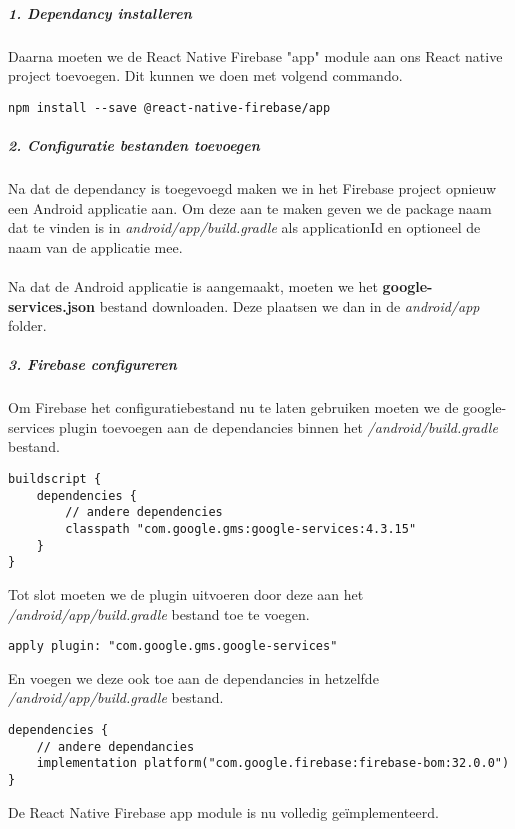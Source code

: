 \subparagraph{1. Dependancy installeren}
Daarna moeten we de React Native Firebase "app" module aan ons React native project toevoegen. 
Dit kunnen we doen met volgend commando.
\begin{verbatim}
npm install --save @react-native-firebase/app
\end{verbatim}

\subparagraph{2. Configuratie bestanden toevoegen}
Na dat de dependancy is toegevoegd maken we in het Firebase project opnieuw een Android applicatie aan. 
Om deze aan te maken geven we de package naam dat te vinden is in \textit{android/app/build.gradle} als 
applicationId en optioneel de naam van de applicatie mee.
\\\\
Na dat de Android applicatie is aangemaakt, moeten we het \textbf{google-services.json} bestand downloaden. 
Deze plaatsen we dan in de \textit{android/app} folder.

\subparagraph{3. Firebase configureren}
Om Firebase het configuratiebestand nu te laten gebruiken moeten we de google-services plugin toevoegen aan 
de dependancies binnen het \textit{/android/build.gradle} bestand. 
\begin{verbatim}
buildscript {
    dependencies {
        // andere dependencies
        classpath "com.google.gms:google-services:4.3.15"
    }
}
\end{verbatim}
Tot slot moeten we de plugin uitvoeren door deze aan het \textit{/android/app/build.gradle} bestand toe te voegen.
\begin{verbatim}
apply plugin: "com.google.gms.google-services"
\end{verbatim}
En voegen we deze ook toe aan de dependancies in hetzelfde \textit{/android/app/build.gradle} bestand.
\begin{verbatim}
dependencies {
    // andere dependancies
    implementation platform("com.google.firebase:firebase-bom:32.0.0")
}
\end{verbatim}
De React Native Firebase app module is nu volledig geïmplementeerd.